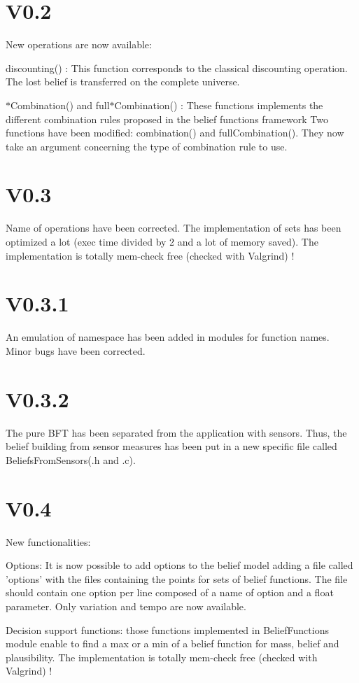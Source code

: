 \hypertarget{version_sec_v02_subsec}{}\section{V0.2}\label{version_sec_v02_subsec}
New operations are now available: \begin{DoxyItemize}
\item discounting() : This function corresponds to the classical discounting operation. The lost belief is transferred on the complete universe. \item $\ast$Combination() and full$\ast$Combination() : These functions implements the different combination rules proposed in the belief functions framework Two functions have been modified: combination() and fullCombination(). They now take an argument concerning the type of combination rule to use.\end{DoxyItemize}
\hypertarget{version_sec_v03_subsec}{}\section{V0.3}\label{version_sec_v03_subsec}
Name of operations have been corrected. The implementation of sets has been optimized a lot (exec time divided by 2 and a lot of memory saved). The implementation is totally mem-\/check free (checked with Valgrind) !\hypertarget{version_sec_v03_1_subsec}{}\section{V0.3.1}\label{version_sec_v03_1_subsec}
An emulation of namespace has been added in modules for function names. Minor bugs have been corrected.\hypertarget{version_sec_v03_2_subsec}{}\section{V0.3.2}\label{version_sec_v03_2_subsec}
The pure BFT has been separated from the application with sensors. Thus, the belief building from sensor measures has been put in a new specific file called BeliefsFromSensors(.h and .c).\hypertarget{version_sec_v04_subsec}{}\section{V0.4}\label{version_sec_v04_subsec}
New functionalities: \begin{DoxyItemize}
\item Options: It is now possible to add options to the belief model adding a file called 'options' with the files containing the points for sets of belief functions. The file should contain one option per line composed of a name of option and a float parameter. Only variation and tempo are now available. \item Decision support functions: those functions implemented in BeliefFunctions module enable to find a max or a min of a belief function for mass, belief and plausibility. The implementation is totally mem-\/check free (checked with Valgrind) !\end{DoxyItemize}
